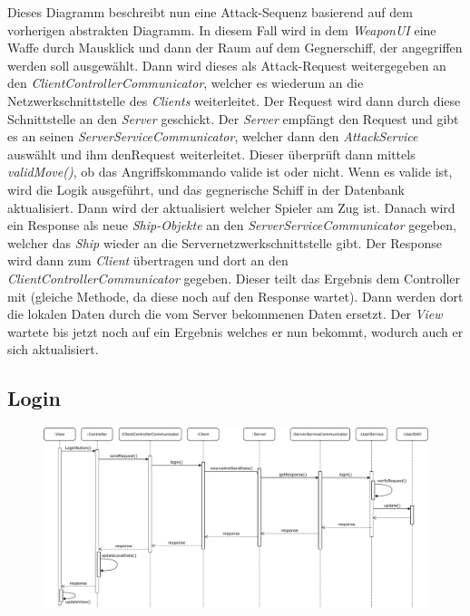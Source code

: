 \documentclass[fontsize=12pt,paper=a4,twoside]{scrartcl}
\begin{document}
Dieses Diagramm beschreibt nun eine Attack-Sequenz basierend auf dem vorherigen abstrakten Diagramm. In diesem Fall wird in dem \textit{WeaponUI} eine Waffe durch Mausklick und dann der Raum auf dem Gegnerschiff, der angegriffen werden soll ausgewählt. Dann wird dieses als Attack-Request weitergegeben an den \textit{ClientControllerCommunicator}, welcher es wiederum an die Netzwerkschnittstelle des \textit{Clients} weiterleitet. Der Request wird dann durch diese Schnittstelle an den \textit{Server} geschickt. Der \textit{Server} empfängt den Request und gibt es an seinen \textit{ServerServiceCommunicator}, welcher dann den \textit{AttackService} auswählt und ihm denRequest weiterleitet. Dieser überprüft dann mittels \textit{validMove()}, ob das Angriffskommando valide ist oder nicht. Wenn es valide ist, wird die Logik ausgeführt, und das gegnerische Schiff in der Datenbank aktualisiert. Dann wird der aktualisiert welcher Spieler am Zug ist. Danach wird ein Response als neue \textit{Ship-Objekte} an den \textit{ServerServiceCommunicator} gegeben, welcher das \textit{Ship} wieder an die Servernetzwerkschnittstelle gibt. Der Response wird dann zum \textit{Client} übertragen und dort an den \textit{ClientControllerCommunicator} gegeben. Dieser teilt das Ergebnis dem Controller mit (gleiche Methode, da diese noch auf den Response wartet). Dann werden dort die lokalen Daten durch die vom Server bekommenen Daten ersetzt. Der \textit{View} wartete bis jetzt noch auf ein Ergebnis welches er nun bekommt, wodurch auch er sich aktualisiert.


\subsection{Login}

\begin{figure}[H]
\begin{center}
  \includegraphics[width=\linewidth]{UML/Sequenz-Client-login.pdf}
\end{center}
\end{figure}
\end{document}
